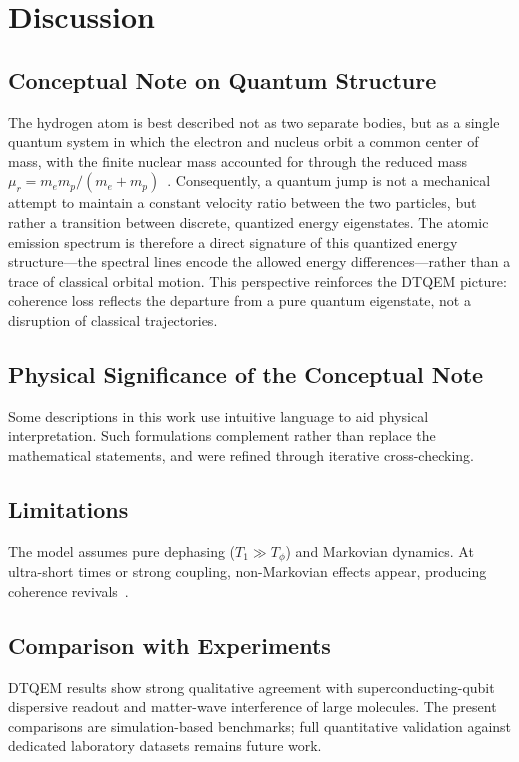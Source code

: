 \documentclass[reprint,amsmath,amssymb,aps,pra,superscriptaddress]{revtex4-2}
\begin{document}
\section{Discussion}
\subsection{Conceptual Note on Quantum Structure}
The hydrogen atom is best described not as two separate bodies, but as a
single quantum system in which the electron and nucleus orbit a common center
of mass, with the finite nuclear mass accounted for through the reduced mass
$\mu_r = m_e m_p/(m_e+m_p)$~\cite{weiss2012}. Consequently, a quantum jump
is not a mechanical attempt to maintain a constant velocity ratio between the
two particles, but rather a transition between discrete, quantized energy
eigenstates. The atomic emission spectrum is therefore a direct signature of
this quantized energy structure---the spectral lines encode the allowed
energy differences---rather than a trace of classical orbital motion. This
perspective reinforces the DTQEM picture: coherence loss reflects the
departure from a pure quantum eigenstate, not a disruption of classical
trajectories.

\subsection{Physical Significance of the Conceptual Note}
Some descriptions in this work use intuitive language to aid physical
interpretation. Such formulations complement rather than replace the
mathematical statements, and were refined through iterative cross-checking.

\subsection{Limitations}
The model assumes pure dephasing ($T_1\gg T_\phi$) and Markovian dynamics.
At ultra-short times or strong coupling, non-Markovian effects appear,
producing coherence revivals~\cite{breuer2016,rivas2014}.

\subsection{Comparison with Experiments}
DTQEM results show strong qualitative agreement with superconducting-qubit
dispersive readout and matter-wave interference of large molecules.
The present comparisons are simulation-based benchmarks; full quantitative
validation against dedicated laboratory datasets remains future work.
\end{document}
